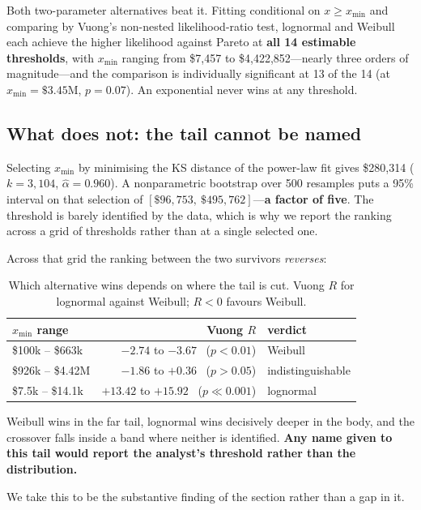 \documentclass[11pt,a4paper]{article}
\begin{document}
Both two-parameter alternatives beat it. Fitting conditional on $x \ge x_{\min}$ and comparing
by Vuong's non-nested likelihood-ratio test, lognormal and Weibull each achieve the higher
likelihood against Pareto at \textbf{all 14 estimable thresholds}, with $x_{\min}$ ranging from
\$7{,}457 to \$4{,}422{,}852---nearly three orders of magnitude---and the comparison is
individually significant at 13 of the 14 (at $x_{\min} = \$3.45$M, $p = 0.07$). An exponential
never wins at any threshold.

\subsection{What does not: the tail cannot be named}

Selecting $x_{\min}$ by minimising the KS distance of the power-law fit gives \$280{,}314
($k = 3{,}104$, $\hat\alpha = 0.960$). A nonparametric bootstrap over 500 resamples puts a 95\%
interval on that selection of $[\$96{,}753,\ \$495{,}762]$---\textbf{a factor of five}. The
threshold is barely identified by the data, which is why we report the ranking across a grid of
thresholds rather than at a single selected one.

Across that grid the ranking between the two survivors \emph{reverses}:

\begin{table}[htbp]
\centering
\caption{Which alternative wins depends on where the tail is cut. Vuong $R$ for lognormal
against Weibull; $R<0$ favours Weibull.}
\label{tab:reverse}
\begin{tabular}{lrl}
\toprule
$x_{\min}$ range & Vuong $R$ & verdict \\
\midrule
\$100k -- \$663k & $-2.74$ to $-3.67$ \ ($p<0.01$) & Weibull \\
\$926k -- \$4.42M & $-1.86$ to $+0.36$ \ ($p>0.05$) & indistinguishable \\
\$7.5k -- \$14.1k & $+13.42$ to $+15.92$ \ ($p \ll 0.001$) & lognormal \\
\bottomrule
\end{tabular}
\end{table}

Weibull wins in the far tail, lognormal wins decisively deeper in the body, and the crossover
falls inside a band where neither is identified. \textbf{Any name given to this tail would
report the analyst's threshold rather than the distribution.}

We take this to be the substantive finding of the section rather than a gap in it.
\end{document}

